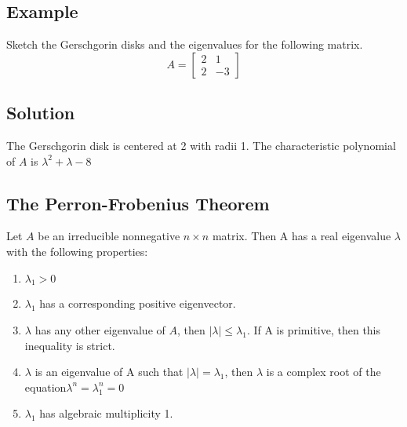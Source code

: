 \subsection*{Example}
Sketch the Gerschgorin disks and the eigenvalues for the following matrix. $$A = \begin{bmatrix}
    2&1\\2&-3
\end{bmatrix}$$
\subsection*{Solution}
The Gerschgorin disk is centered at 2 with radii 1. The characteristic polynomial of $A$ is $\lambda^2+\lambda - 8$

\subsection*{The Perron-Frobenius Theorem}
Let $A$ be an irreducible nonnegative $n\times n$ matrix. Then A has a real eigenvalue $\lambda$ with the following properties:
\begin{enumerate}[a]
    \item $\lambda_1 > 0$
    \item $\lambda_1$ has a corresponding positive eigenvector.
    \item $\lambda$ has any other eigenvalue of $A$, then $|\lambda| \leq \lambda_1$. If A is primitive, then this inequality is strict. 
    \item $\lambda$ is an eigenvalue of A such that $|\lambda| = \lambda_1$, then $\lambda$ is a complex root of the equation$\lambda^n = \lambda^n_1 = 0$
    \item $\lambda_1$ has algebraic multiplicity 1.
\end{enumerate}




